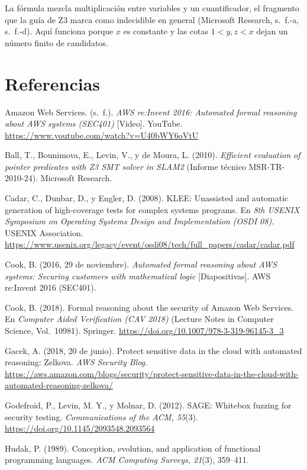 \documentclass[11pt,letterpaper]{article}
\begin{document}
La fórmula mezcla multiplicación entre variables y un cuantificador, el fragmento que la guía de Z3 marca como indecidible en general (Microsoft Research, s.~f.-a, s.~f.-d). Aquí funciona porque $x$ es constante y las cotas $1 < y, z < x$ dejan un número finito de candidatos.

\section*{Referencias}

\begin{list}{}{\setlength{\leftmargin}{1.27cm}\setlength{\itemindent}{-1.27cm}\setlength{\itemsep}{4pt}\setlength{\parsep}{0pt}}
\raggedright
\item Amazon Web Services. (s.~f.). \emph{AWS re:Invent 2016: Automated formal reasoning about AWS systems (SEC401)} [Video]. YouTube. \url{https://www.youtube.com/watch?v=U40bWY6oVtU}
\item Ball, T., Bounimova, E., Levin, V., y de Moura, L. (2010). \emph{Efficient evaluation of pointer predicates with Z3 SMT solver in SLAM2} (Informe técnico MSR-TR-2010-24). Microsoft Research.
\item Cadar, C., Dunbar, D., y Engler, D. (2008). KLEE: Unassisted and automatic generation of high-coverage tests for complex systems programs. En \emph{8th USENIX Symposium on Operating Systems Design and Implementation (OSDI 08)}. USENIX Association. \url{https://www.usenix.org/legacy/event/osdi08/tech/full_papers/cadar/cadar.pdf}
\item Cook, B. (2016, 29 de noviembre). \emph{Automated formal reasoning about AWS systems: Securing customers with mathematical logic} [Diapositivas]. AWS re:Invent 2016 (SEC401).
\item Cook, B. (2018). Formal reasoning about the security of Amazon Web Services. En \emph{Computer Aided Verification (CAV 2018)} (Lecture Notes in Computer Science, Vol.~10981). Springer. \url{https://doi.org/10.1007/978-3-319-96145-3_3}
\item Gacek, A. (2018, 20 de junio). Protect sensitive data in the cloud with automated reasoning: Zelkova. \emph{AWS Security Blog}. \url{https://aws.amazon.com/blogs/security/protect-sensitive-data-in-the-cloud-with-automated-reasoning-zelkova/}
\item Godefroid, P., Levin, M. Y., y Molnar, D. (2012). SAGE: Whitebox fuzzing for security testing. \emph{Communications of the ACM, 55}(3). \url{https://doi.org/10.1145/2093548.2093564}
\item Hudak, P. (1989). Conception, evolution, and application of functional programming languages. \emph{ACM Computing Surveys, 21}(3), 359--411.

\end{list}
\end{document}
